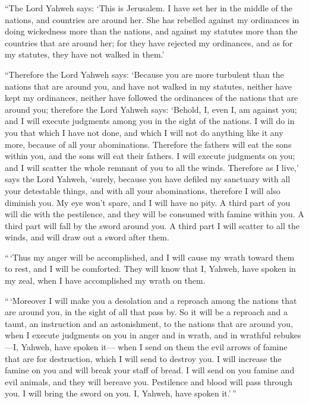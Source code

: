  ``The Lord Yahweh says: `This is Jerusalem. I have set
her in the middle of the nations, and countries are around her.
 She has rebelled against my ordinances in doing
wickedness more than the nations, and against my statutes more than the
countries that are around her; for they have rejected my ordinances, and
as for my statutes, they have not walked in them.'

 ``Therefore the Lord Yahweh says: `Because you are more
turbulent than the nations that are around you, and have not walked in
my statutes, neither have kept my ordinances, neither have followed the
ordinances of the nations that are around you;  therefore
the Lord Yahweh says: `Behold, I, even I, am against you; and I will
execute judgments among you in the sight of the nations. 
I will do in you that which I have not done, and which I will not do
anything like it any more, because of all your abominations.
 Therefore the fathers will eat the sons within you, and
the sons will eat their fathers. I will execute judgments on you; and I
will scatter the whole remnant of you to all the winds. 
Therefore as I live,' says the Lord Yahweh, `surely, because you have
defiled my sanctuary with all your detestable things, and with all your
abominations, therefore I will also diminish you. My eye won't spare,
and I will have no pity.  A third part of you will die
with the pestilence, and they will be consumed with famine within you. A
third part will fall by the sword around you. A third part I will
scatter to all the winds, and will draw out a sword after them.

 ``\,`Thus my anger will be accomplished, and I will
cause my wrath toward them to rest, and I will be comforted. They will
know that I, Yahweh, have spoken in my zeal, when I have accomplished my
wrath on them.

 ``\,`Moreover I will make you a desolation and a
reproach among the nations that are around you, in the sight of all that
pass by.  So it will be a reproach and a taunt, an
instruction and an astonishment, to the nations that are around you,
when I execute judgments on you in anger and in wrath, and in wrathful
rebukes---I, Yahweh, have spoken it---  when I send on
them the evil arrows of famine that are for destruction, which I will
send to destroy you. I will increase the famine on you and will break
your staff of bread.  I will send on you famine and evil
animals, and they will bereave you. Pestilence and blood will pass
through you. I will bring the sword on you. I, Yahweh, have spoken
it.'\,''

